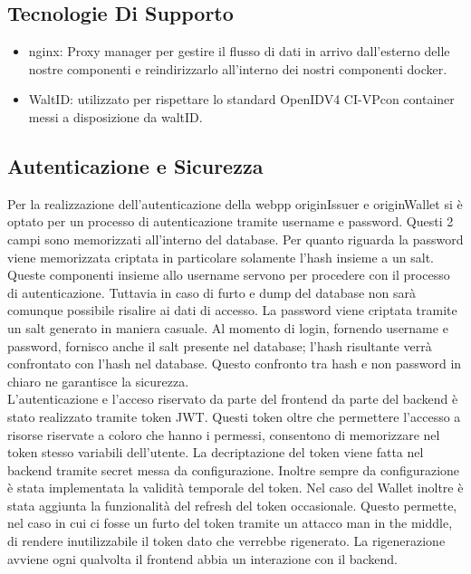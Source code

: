 \subsection{Tecnologie Di Supporto}
\begin{itemize}
    \item nginx: Proxy manager per gestire il flusso di dati in arrivo dall'esterno delle nostre componenti e reindirizzarlo all'interno dei nostri componenti docker.
    \item WaltID: utilizzato per rispettare lo standard OpenIDV4 CI-VP\glo con container messi a disposizione da waltID.
\end{itemize}

\subsection{Autenticazione e Sicurezza}
Per la realizzazione dell'autenticazione della webpp originIssuer e originWallet si è optato per un processo di autenticazione tramite username e password. Questi 2 campi sono memorizzati all'interno del database. Per quanto riguarda la password viene memorizzata criptata in particolare solamente l'hash insieme a un salt. Queste componenti insieme allo username servono per procedere con il processo di autenticazione. Tuttavia in caso di furto e dump del database non sarà comunque possibile risalire ai dati di accesso. 
La password viene criptata tramite un salt generato in maniera casuale. Al momento di login, fornendo username e password, fornisco anche il salt presente nel database; l'hash risultante verrà confrontato con l'hash nel database. Questo confronto tra hash e non password in chiaro ne garantisce la sicurezza.\\
L'autenticazione e l'acceso riservato da parte del frontend da parte del backend è stato realizzato tramite token JWT. Questi token oltre che permettere l'accesso a risorse riservate a coloro che hanno i permessi, consentono di memorizzare nel token stesso variabili dell'utente. La decriptazione del token viene fatta nel backend tramite secret messa da configurazione. Inoltre sempre da configurazione è stata implementata  la validità temporale del token. Nel caso del Wallet inoltre è stata aggiunta la funzionalità del refresh del token occasionale. Questo permette, nel caso in cui ci fosse un furto del token tramite un attacco man in the middle, di rendere inutilizzabile il token dato che verrebbe rigenerato.  La rigenerazione avviene ogni qualvolta il frontend abbia un interazione con il backend.

